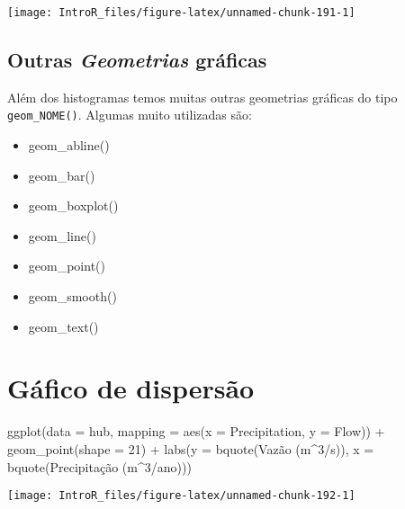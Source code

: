 \documentclass[
]{book}
\newenvironment{Shaded}{\begin{snugshade}}{\end{snugshade}}
\newcommand{\AttributeTok}[1]{\textcolor[rgb]{0.77,0.63,0.00}{#1}}
\newcommand{\DecValTok}[1]{\textcolor[rgb]{0.00,0.00,0.81}{#1}}
\newcommand{\FunctionTok}[1]{\textcolor[rgb]{0.00,0.00,0.00}{#1}}
\newcommand{\NormalTok}[1]{#1}
\newcommand{\SpecialCharTok}[1]{\textcolor[rgb]{0.00,0.00,0.00}{#1}}
\providecommand{\tightlist}{%
  \setlength{\itemsep}{0pt}\setlength{\parskip}{0pt}}
\begin{document}
\begin{center}\texttt{[image: IntroR\_files/figure-latex/unnamed-chunk-191-1]} \end{center}

\hypertarget{outras-geometrias-gruxe1ficas}{%
\subsection{\texorpdfstring{Outras \emph{Geometrias} gráficas}{Outras Geometrias gráficas}}\label{outras-geometrias-gruxe1ficas}}

Além dos histogramas temos muitas outras geometrias gráficas do tipo \texttt{geom\_NOME()}. Algumas muito utilizadas são:

\begin{itemize}
\tightlist
\item
  geom\_abline()
\item
  geom\_bar()
\item
  geom\_boxplot()
\item
  geom\_line()
\item
  geom\_point()
\item
  geom\_smooth()
\item
  geom\_text()
\end{itemize}

\hypertarget{guxe1fico-de-dispersuxe3o}{%
\section{Gáfico de dispersão}\label{guxe1fico-de-dispersuxe3o}}

\begin{Shaded}
\begin{Highlighting}[]
\FunctionTok{ggplot}\NormalTok{(}\AttributeTok{data =}\NormalTok{ hub, }\AttributeTok{mapping =} \FunctionTok{aes}\NormalTok{(}\AttributeTok{x =}\NormalTok{ Precipitation, }\AttributeTok{y =}\NormalTok{ Flow)) }\SpecialCharTok{+}
  \FunctionTok{geom\_point}\NormalTok{(}\AttributeTok{shape =} \DecValTok{21}\NormalTok{) }\SpecialCharTok{+}
  \FunctionTok{labs}\NormalTok{(}\AttributeTok{y =} \FunctionTok{bquote}\NormalTok{(Vazão (m}\SpecialCharTok{\^{}}\DecValTok{3}\SpecialCharTok{/}\NormalTok{s)),}
       \AttributeTok{x =} \FunctionTok{bquote}\NormalTok{(Precipitação (m}\SpecialCharTok{\^{}}\DecValTok{3}\SpecialCharTok{/}\NormalTok{ano)))}
\end{Highlighting}
\end{Shaded}

\begin{center}\texttt{[image: IntroR\_files/figure-latex/unnamed-chunk-192-1]} \end{center}
\end{document}

